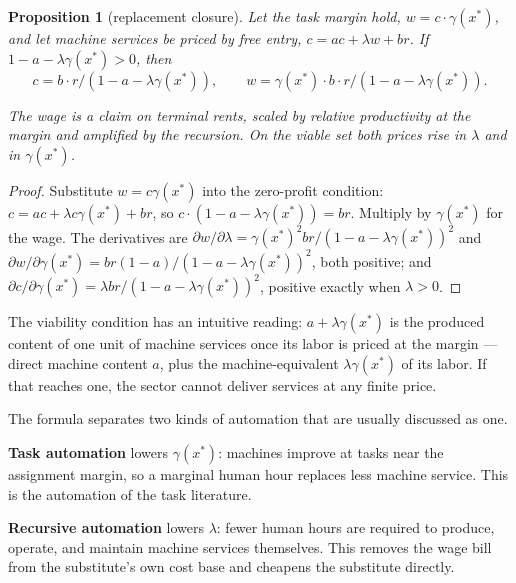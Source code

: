 \documentclass[12pt]{article}
\theoremstyle{plain}
\newtheorem{proposition}{Proposition}
\begin{document}
\begin{proposition}[replacement closure]\label{prop:replacement}
Let the task margin hold, $w = c\cdot \gamma (x^*)$, and let machine services be priced by free entry, $c = ac + \lambda w + br$. If $1 - a - \lambda \gamma (x^*) > 0$, then
\begin{equation}\label{eq:closure}
c = b\cdot r / (1 - a - \lambda \gamma (x^*)),\qquad w = \gamma (x^*)\cdot b\cdot r / (1 - a - \lambda \gamma (x^*)).
\end{equation}

The wage is a claim on terminal rents, scaled by relative productivity at the margin and amplified by the recursion. On the viable set both prices rise in $\lambda$ and in $\gamma (x^*)$.
\end{proposition}

\begin{proof}
Substitute $w = c\gamma (x^*)$ into the zero-profit condition: $c = ac + \lambda c\gamma (x^*) + br$, so $c\cdot (1 - a - \lambda \gamma (x^*)) = br$. Multiply by $\gamma (x^*)$ for the wage. The derivatives are $\partial w/\partial \lambda = \gamma (x^*)^2br/(1-a-\lambda \gamma (x^*))^2$ and $\partial w/\partial \gamma (x^*) = br(1-a)/(1-a-\lambda \gamma (x^*))^2$, both positive; and $\partial c/\partial \gamma (x^*) = \lambda br/(1-a-\lambda \gamma (x^*))^2$, positive exactly when $\lambda > 0$.
\end{proof}

The viability condition has an intuitive reading: $a + \lambda \gamma (x^*)$ is the produced content of one unit of machine services once its labor is priced at the margin --- direct machine content $a$, plus the machine-equivalent $\lambda \gamma (x^*)$ of its labor. If that reaches one, the sector cannot deliver services at any finite price.

The formula separates two kinds of automation that are usually discussed as one.

\textbf{Task automation} lowers $\gamma (x^*)$: machines improve at tasks near the assignment margin, so a marginal human hour replaces less machine service. This is the automation of the task literature.

\textbf{Recursive automation} lowers $\lambda$: fewer human hours are required to produce, operate, and maintain machine services themselves. This removes the wage bill from the substitute's own cost base and cheapens the substitute directly.
\end{document}
